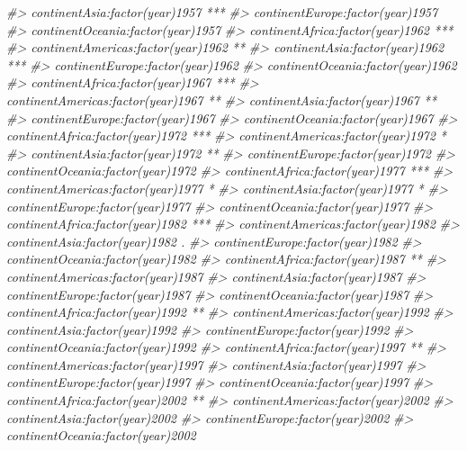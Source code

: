 \documentclass[]{book}
\newenvironment{Shaded}{\begin{snugshade}}{\end{snugshade}}
\newcommand{\CommentTok}[1]{\textcolor[rgb]{0.56,0.35,0.01}{\textit{#1}}}
\begin{document}
\begin{Shaded}
\begin{Highlighting}[]
\CommentTok{#> continentAsia:factor(year)1957     ***}
\CommentTok{#> continentEurope:factor(year)1957      }
\CommentTok{#> continentOceania:factor(year)1957     }
\CommentTok{#> continentAfrica:factor(year)1962   ***}
\CommentTok{#> continentAmericas:factor(year)1962 ** }
\CommentTok{#> continentAsia:factor(year)1962     ***}
\CommentTok{#> continentEurope:factor(year)1962      }
\CommentTok{#> continentOceania:factor(year)1962     }
\CommentTok{#> continentAfrica:factor(year)1967   ***}
\CommentTok{#> continentAmericas:factor(year)1967 ** }
\CommentTok{#> continentAsia:factor(year)1967     ** }
\CommentTok{#> continentEurope:factor(year)1967      }
\CommentTok{#> continentOceania:factor(year)1967     }
\CommentTok{#> continentAfrica:factor(year)1972   ***}
\CommentTok{#> continentAmericas:factor(year)1972 *  }
\CommentTok{#> continentAsia:factor(year)1972     ** }
\CommentTok{#> continentEurope:factor(year)1972      }
\CommentTok{#> continentOceania:factor(year)1972     }
\CommentTok{#> continentAfrica:factor(year)1977   ***}
\CommentTok{#> continentAmericas:factor(year)1977 *  }
\CommentTok{#> continentAsia:factor(year)1977     *  }
\CommentTok{#> continentEurope:factor(year)1977      }
\CommentTok{#> continentOceania:factor(year)1977     }
\CommentTok{#> continentAfrica:factor(year)1982   ***}
\CommentTok{#> continentAmericas:factor(year)1982    }
\CommentTok{#> continentAsia:factor(year)1982     .  }
\CommentTok{#> continentEurope:factor(year)1982      }
\CommentTok{#> continentOceania:factor(year)1982     }
\CommentTok{#> continentAfrica:factor(year)1987   ** }
\CommentTok{#> continentAmericas:factor(year)1987    }
\CommentTok{#> continentAsia:factor(year)1987        }
\CommentTok{#> continentEurope:factor(year)1987      }
\CommentTok{#> continentOceania:factor(year)1987     }
\CommentTok{#> continentAfrica:factor(year)1992   ** }
\CommentTok{#> continentAmericas:factor(year)1992    }
\CommentTok{#> continentAsia:factor(year)1992        }
\CommentTok{#> continentEurope:factor(year)1992      }
\CommentTok{#> continentOceania:factor(year)1992     }
\CommentTok{#> continentAfrica:factor(year)1997   ** }
\CommentTok{#> continentAmericas:factor(year)1997    }
\CommentTok{#> continentAsia:factor(year)1997        }
\CommentTok{#> continentEurope:factor(year)1997      }
\CommentTok{#> continentOceania:factor(year)1997     }
\CommentTok{#> continentAfrica:factor(year)2002   ** }
\CommentTok{#> continentAmericas:factor(year)2002    }
\CommentTok{#> continentAsia:factor(year)2002        }
\CommentTok{#> continentEurope:factor(year)2002      }
\CommentTok{#> continentOceania:factor(year)2002     }

\end{Highlighting}
\end{Shaded}
\end{document}
